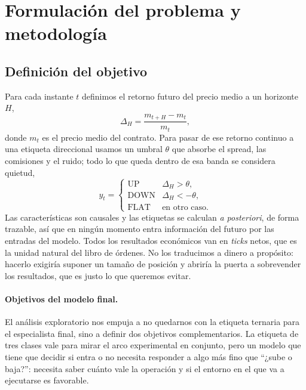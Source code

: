 \documentclass[11pt,a4paper]{article}
\begin{document}
\section{Formulación del problema y metodología}
\label{sec:metodo}

\subsection{Definición del objetivo}

Para cada instante $t$ definimos el retorno futuro del precio medio a un horizonte
$H$,
\[
\Delta_H = \frac{m_{t+H} - m_t}{m_t},
\]
donde $m_t$ es el precio medio del contrato. Para pasar de ese retorno continuo a
una etiqueta direccional usamos un umbral $\theta$ que absorbe el spread, las
comisiones y el ruido; todo lo que queda dentro de esa banda se considera quietud,
\[
y_t = \begin{cases}
\text{UP} & \Delta_H > \theta,\\
\text{DOWN} & \Delta_H < -\theta,\\
\text{FLAT} & \text{en otro caso.}
\end{cases}
\]
Las características son causales y las etiquetas se calculan \emph{a posteriori}, de
forma trazable, así que en ningún momento entra información del futuro por las
entradas del modelo. Todos los resultados económicos van en \emph{ticks} netos, que
es la unidad natural del libro de órdenes. No los traducimos a dinero a propósito:
hacerlo exigiría suponer un tamaño de posición y abriría la puerta a sobrevender los
resultados, que es justo lo que queremos evitar.

\paragraph{Objetivos del modelo final.}
El análisis exploratorio nos empuja a no quedarnos con la etiqueta ternaria para el
especialista final, sino a definir dos objetivos complementarios. La etiqueta de
tres clases vale para mirar el arco experimental en conjunto, pero un modelo que
tiene que decidir si entra o no necesita responder a algo más fino que ``¿sube o
baja?'': necesita saber cuánto vale la operación y si el entorno en el que va a
ejecutarse es favorable.
\end{document}
